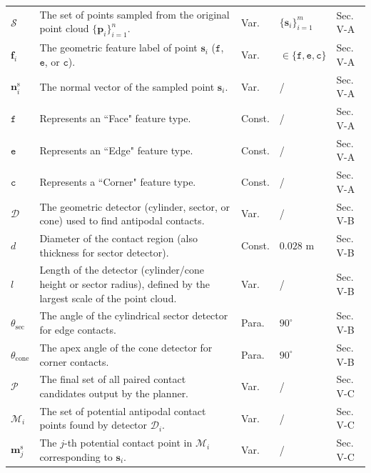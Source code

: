 \documentclass[onecolumn]{IEEEtran}
\begin{document}
\begin{longtable}{p{1cm} p{10cm} p{1cm} p{1.8cm} p{2 cm}}
$\mathcal{S}$ & The set of points sampled from the original point cloud $\{\mathbf{p}_i\}_{i=1}^n$. & Var. & $\{\mathbf{s}_i\}_{i=1}^m$ & Sec. V-A \\

$\mathbf{f}_i$ & The geometric feature label of point $\mathbf{s}_i$ ($\mathtt{f}$, $\mathtt{e}$, or $\mathtt{c}$). & Var. & $\in \{\mathtt{f}, \mathtt{e}, \mathtt{c}\}$ & Sec. V-A \\

$\mathbf{n}_i^\text{s}$ & The normal vector of the sampled point $\mathbf{s}_i$. & Var. & / & Sec. V-A \\

$\mathtt{f}$ & Represents an ``Face" feature type. & Const. & / & Sec. V-A \\
$\mathtt{e}$ & Represents an ``Edge" feature type. & Const. & / & Sec. V-A \\
$\mathtt{c}$ & Represents a ``Corner" feature type. & Const. & / & Sec. V-A \\

$\mathcal{D}$ & The geometric detector (cylinder, sector, or cone) used to find antipodal contacts. & Var. & / & Sec. V-B \\

$d$ & Diameter of the contact region (also thickness for sector detector). & Const. & $0.028$ m & Sec. V-B \\

$l$ & Length of the detector (cylinder/cone height or sector radius), defined by the largest scale of the point cloud. & Var. & / & Sec. V-B \\

$\theta_{\text{sec}}$ & The angle of the cylindrical sector detector for edge contacts. & Para. & $90^\circ$ & Sec. V-B \\

$\theta_{\text{cone}}$ & The apex angle of the cone detector for corner contacts. & Para. & $90^\circ$ & Sec. V-B \\

$\mathcal{P}$ & The final set of all paired contact candidates output by the planner. & Var. & / & Sec. V-C \\

$\mathcal{M}_i$ & The set of potential antipodal contact points found by detector $\mathcal{D}_i$. & Var. & / & Sec. V-C \\

$\mathbf{m}_j^\text{s}$ & The $j$-th potential contact point in $\mathcal{M}_i$ corresponding to $\mathbf{s}_i$. & Var. & / & Sec. V-C \\


\end{longtable}
\end{document}
